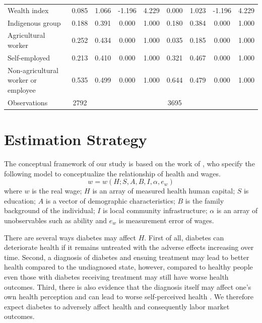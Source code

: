 \documentclass[12pt,english,british]{article}
\begin{document}
\begin{table}[h!]
\begin{center}
\begin{adjustbox}{max width=\textwidth}
{\begin{tabular}{l*{2}{cccc}}
Wealth index        &       0.085&       1.066&      -1.196&       4.229&       0.000&       1.023&      -1.196&       4.229\\
Indigenous group    &       0.188&       0.391&       0.000&       1.000&       0.180&       0.384&       0.000&       1.000\\
Agricultural worker &       0.252&       0.434&       0.000&       1.000&       0.035&       0.185&       0.000&       1.000\\
Self-employed       &       0.213&       0.410&       0.000&       1.000&       0.321&       0.467&       0.000&       1.000\\
Non-agricultural worker or employee&       0.535&       0.499&       0.000&       1.000&       0.644&       0.479&       0.000&       1.000\\
\midrule
Observations        &        2792&            &            &            &        3695&            &            &            \\
\bottomrule
\end{tabular}%
}
\end{adjustbox}
\end{center}
\end{table}  
  


\section{\label{sec:Estimation Strategy}Estimation Strategy}

  
The conceptual framework of our study is based on the work of \citet{Strauss1998},  who specify the following model to conceptualize the relationship of health and wages.
\begin{equation}
w=w(H;S,A,B,I,\alpha,e_{w})\label{eq:wage}
\end{equation}
where $w$ is the real wage; $H$ is an array of measured health human capital; $S$ is education; $A$ is a vector of demographic characteristics; $B$ is the family background of the individual; $I$ is local community infrastructure; $\alpha$ is an array of unobservables such as ability and $e_w$ is measurement error of wages. 

There are several ways diabetes may affect $H$. First of all, diabetes can deteriorate health if it remains untreated with the adverse effects increasing over time. Second, a diagnosis of diabetes and ensuing treatment may lead to better health compared to the undiagnosed state, however, compared to healthy people even those with diabetes receiving treatment may still have worse health outcomes. Third, there is also evidence that the diagnosis itself may affect one's own health perception and can lead to worse self-perceived health \citep{17003303}. We therefore expect diabetes to adversely affect health and consequently labor market outcomes.
\end{document}
